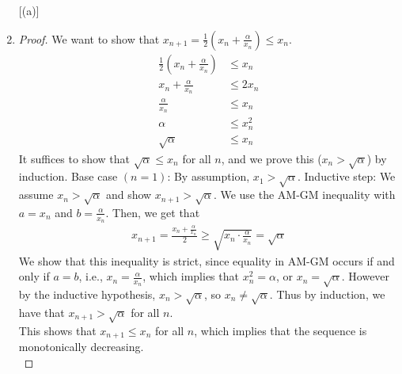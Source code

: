\documentclass[11pt]{article}
\begin{document}
\begin{exercise}{16}
    \begin{solution}
        \begin{enumerate} [(a)]
        \item \begin{proof}
            We want to show that $x_{n+1} = \frac{1}{2} (x_n + \frac{\alpha}{x_n})\le x_n$. \begin{equation*}
                \begin{split}
                    \frac{1}{2} \left( x_n + \frac{\alpha}{x_n} \right) & \le x_n \\
                    x_n + \frac{\alpha}{x_n} & \le 2 x_n \\
                    \frac{\alpha}{x_n} & \le x_n \\
                    \alpha & \le x_n^2 \\
                    \sqrt{\alpha} & \le x_n
                \end{split}
            \end{equation*}
            It suffices to show that $\sqrt{\alpha} \le x_n$ for all $n$, and we prove this ($x_n > \sqrt{\alpha}$) by induction. Base case $(n=1)$: By assumption, $x_1 > \sqrt{\alpha}$. Inductive step: We assume $x_n > \sqrt{\alpha}$ and show $x_{n+1} > \sqrt{\alpha}$. We use the AM-GM inequality with $a= x_n$ and $b = \frac{\alpha}{x_n}$. Then, we get that \begin{equation*}
                \begin{split}
                    x_{n+1} = \frac{x_n + \frac{\alpha}{x_n}}{2} \ge \sqrt{x_n \cdot \frac{\alpha}{x_n}} = \sqrt{\alpha}
                \end{split}
            \end{equation*}
            We show that this inequality is strict, since equality in AM-GM occurs if and only if $a = b$, i.e., $x_n = \frac{\alpha}{x_n}$, which implies that $x_n^2 = \alpha$, or $x_n = \sqrt{\alpha}$. However by the inductive hypothesis, $x_n > \sqrt{\alpha}$, so $x_n \neq \sqrt{\alpha}$. Thus by induction, we have that $x_{n+1} > \sqrt{\alpha}$ for all $n$. \\

            This shows that $x_{n+1} \le x_n$ for all $n$, which implies that the sequence is monotonically decreasing. \\


\end{proof}
\end{enumerate}
\end{solution}
\end{exercise}
\end{document}
